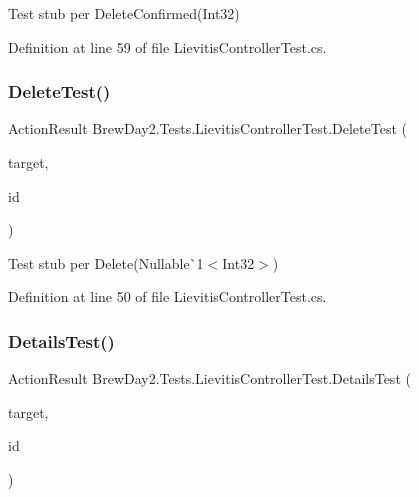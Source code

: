 Test stub per Delete\+Confirmed(\+Int32)



Definition at line 59 of file Lievitis\+Controller\+Test.\+cs.

\mbox{\label{class_brew_day2_1_1_tests_1_1_lievitis_controller_test_ae84fccd200fb39e9e8ebc5a00d72f0fb}} 
\subsubsection{\texorpdfstring{Delete\+Test()}{DeleteTest()}}
{\footnotesize\ttfamily Action\+Result Brew\+Day2.\+Tests.\+Lievitis\+Controller\+Test.\+Delete\+Test (\begin{DoxyParamCaption}\item[{\mbox{[}\+Pex\+Assume\+Under\+Test\mbox{]} \mbox{\hyperlink{class_brew_day2_1_1_controllers_1_1_lievitis_controller}{Lievitis\+Controller}}}]{target,  }\item[{int?}]{id }\end{DoxyParamCaption})}



Test stub per Delete(Nullable\`{}1$<$Int32$>$)



Definition at line 50 of file Lievitis\+Controller\+Test.\+cs.

\mbox{\label{class_brew_day2_1_1_tests_1_1_lievitis_controller_test_ab49cfb2de9fc1773230c2756d6380c31}} 
\subsubsection{\texorpdfstring{Details\+Test()}{DetailsTest()}}
{\footnotesize\ttfamily Action\+Result Brew\+Day2.\+Tests.\+Lievitis\+Controller\+Test.\+Details\+Test (\begin{DoxyParamCaption}\item[{\mbox{[}\+Pex\+Assume\+Under\+Test\mbox{]} \mbox{\hyperlink{class_brew_day2_1_1_controllers_1_1_lievitis_controller}{Lievitis\+Controller}}}]{target,  }\item[{int?}]{id }\end{DoxyParamCaption})}



